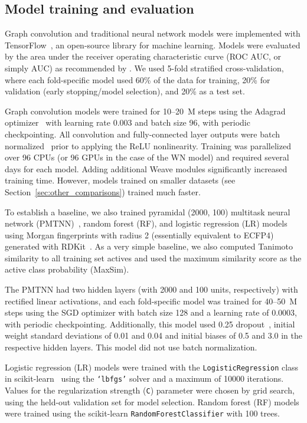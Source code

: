 \subsection{Model training and evaluation}
\label{sec:training}

Graph convolution and traditional neural network models were implemented with
TensorFlow~\citep{abaditensorflow}, an open-source library for machine learning.
Models were evaluated by the area under the receiver operating characteristic
curve (ROC AUC, or simply AUC) as recommended by \citet{jain2008recommendations}. We used 5-fold
stratified cross-validation, where each fold-specific model used 60\% of the
data for training, 20\% for validation (early stopping/model selection), and 20\% as a test set.

Graph convolution models were trained for 10--20~M steps using the Adagrad
optimizer~\citep{duchi2011adaptive} with learning rate 0.003 and batch size 96,
with periodic checkpointing. All convolution and fully-connected layer outputs
were batch normalized~\citep{ioffe2015batch} prior to applying the ReLU
nonlinearity. Training was parallelized over 96 CPUs (or 96 GPUs in the case of
the WN model) and required several days for each model. Adding
additional Weave modules significantly increased training time. However, models
trained on smaller datasets (see Section~\ref{sec:other_comparisons}) trained
much faster.

To establish a baseline, we also trained pyramidal (2000, 100) multitask neural
network (PMTNN)~\citep{ramsundar2015massively}, random forest (RF), and logistic
regression (LR) models using Morgan fingerprints with radius 2 (essentially
equivalent to ECFP4) generated with RDKit~\citep{landrumrdkit}. As a very simple
baseline, we also computed Tanimoto similarity to all training set actives and
used the maximum similarity score as the active class probability (MaxSim).

The PMTNN had two hidden layers (with 2000 and 100 units, respectively) with
rectified linear activations, and each fold-specific model was trained for
40--50~M steps using the SGD optimizer with batch size 128 and a learning rate
of 0.0003, with periodic checkpointing. Additionally, this model used 0.25
dropout~\citep{srivastava2014dropout}, initial weight standard deviations of
0.01 and 0.04 and initial biases of 0.5 and 3.0 in the respective hidden layers.
This model did not use batch normalization.

Logistic regression (LR) models were
trained with the \texttt{LogisticRegression} class in
scikit-learn~\citep{pedregosa2011scikit} using the \texttt{`lbfgs'} solver and
a maximum of \num{10000} iterations. Values for the regularization strength
(\texttt{C}) parameter were chosen by grid search, using the held-out validation
set for model selection. Random forest (RF) models were trained using the
scikit-learn \texttt{RandomForestClassifier} with 100 trees.

